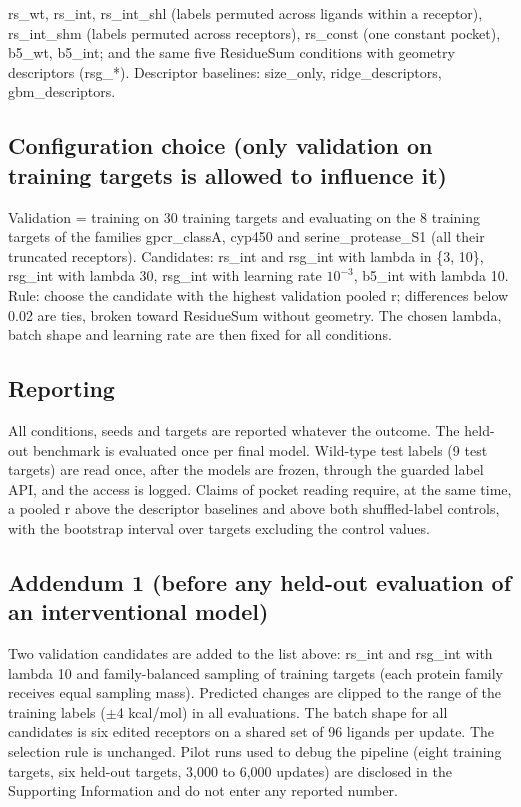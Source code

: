 rs\_wt, rs\_int, rs\_int\_shl (labels permuted across ligands within a receptor), rs\_int\_shm (labels permuted across receptors), rs\_const (one constant pocket), b5\_wt, b5\_int; and the same five ResidueSum conditions with geometry descriptors (rsg\_*). Descriptor baselines: size\_only, ridge\_descriptors, gbm\_descriptors.

\subsection*{Configuration choice (only validation on training targets is allowed to influence it)}

Validation = training on 30 training targets and evaluating on the 8 training targets of the families gpcr\_classA, cyp450 and serine\_protease\_S1 (all their truncated receptors). Candidates: rs\_int and rsg\_int with lambda in \{3, 10\}, rsg\_int with lambda 30, rsg\_int with learning rate $10^{-3}$, b5\_int with lambda 10. Rule: choose the candidate with the highest validation pooled r; differences below 0.02 are ties, broken toward ResidueSum without geometry. The chosen lambda, batch shape and learning rate are then fixed for all conditions.

\subsection*{Reporting}

All conditions, seeds and targets are reported whatever the outcome. The held-out benchmark is evaluated once per final model. Wild-type test labels (9 test targets) are read once, after the models are frozen, through the guarded label API, and the access is logged. Claims of pocket reading require, at the same time, a pooled r above the descriptor baselines and above both shuffled-label controls, with the bootstrap interval over targets excluding the control values.

\subsection*{Addendum 1 (before any held-out evaluation of an interventional model)}

Two validation candidates are added to the list above: rs\_int and rsg\_int with lambda 10 and family-balanced sampling of training targets (each protein family receives equal sampling mass). Predicted changes are clipped to the range of the training labels ($\pm$4 kcal/mol) in all evaluations. The batch shape for all candidates is six edited receptors on a shared set of 96 ligands per update. The selection rule is unchanged. Pilot runs used to debug the pipeline (eight training targets, six held-out targets, 3,000 to 6,000 updates) are disclosed in the Supporting Information and do not enter any reported number.

